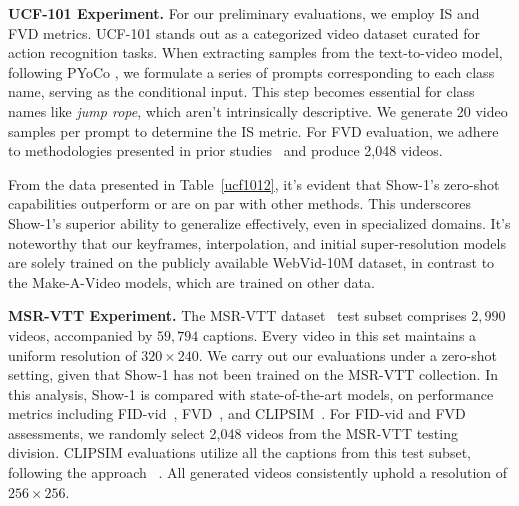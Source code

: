 \documentclass{article} \usepackage{iclr2024_conference,times}
\begin{document}
\noindent\textbf{UCF-101 Experiment.} For our preliminary evaluations, we employ IS and FVD metrics. UCF-101 stands out as a categorized video dataset curated for action recognition tasks. When extracting samples from the text-to-video model, following PYoCo \citep{ge2023preserve}, we formulate a series of prompts corresponding to each class name, serving as the conditional input. This step becomes essential for class names like \textit{jump rope}, which aren't intrinsically descriptive.  We generate 20 video samples per prompt to determine the IS metric. For FVD evaluation, we adhere to methodologies presented in prior studies~\citep{le2021ccvs,tian2021a} and produce 2,048 videos.

From the data presented in Table~\ref{ucf1012}, it's evident that Show-1's zero-shot capabilities outperform or are on par with other methods. This underscores Show-1's superior ability to generalize effectively, even in specialized domains. It's noteworthy that our keyframes, interpolation, and initial super-resolution models are solely trained on the publicly available WebVid-10M dataset, in contrast to the Make-A-Video models, which are trained on other data.


\noindent\textbf{MSR-VTT Experiment.}
The MSR-VTT dataset~\citep{xu2016msr} test subset comprises $2,990$ videos, accompanied by $59,794$ captions. Every video in this set maintains a uniform resolution of $320\times240$. We carry out our evaluations under a zero-shot setting, given that Show-1 has not been trained on the MSR-VTT collection. In this analysis, Show-1 is compared with state-of-the-art models, on performance metrics including FID-vid~\citep{heusel2017gans_nash_equilibrium}, FVD~\citep{unterthiner2018FVD}, and CLIPSIM~\citep{wu2021godiva}. For FID-vid and FVD assessments, we randomly select 2,048 videos from the MSR-VTT testing division. CLIPSIM evaluations utilize all the captions from this test subset, following the approach ~\citep{singer2022make}. All generated videos consistently uphold a resolution of $256 \times 256$.
\end{document}
